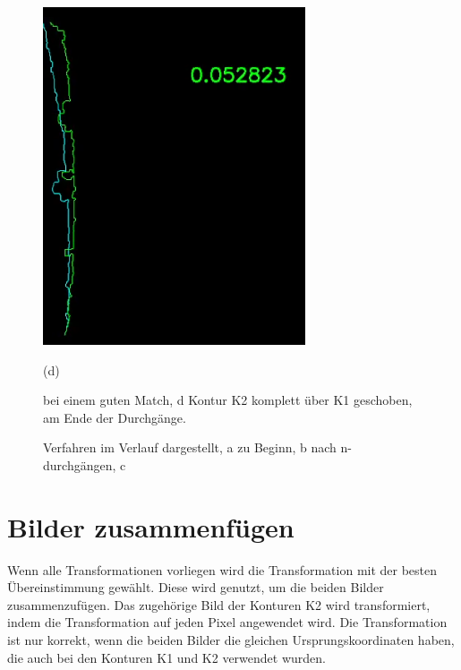 \begin{figure}[h]
\begin{minipage}{0.24\textwidth}
        \includegraphics[width=\textwidth]{images/stitching_end.PNG} %
        \caption*{(d)}
    \end{minipage}\hfill
    \caption{Verfahren im Verlauf dargestellt, a zu Beginn, b nach n-durchgängen, c }
    bei einem guten Match, d Kontur K2 komplett über K1 geschoben, 
    am Ende der Durchgänge.
    \label{fig:stitching_all}
\end{figure}

\section{Bilder zusammenfügen}

Wenn alle Transformationen vorliegen wird die Transformation mit der besten 
Übereinstimmung gewählt. Diese wird genutzt, um die beiden Bilder zusammenzufügen.
Das zugehörige Bild der Konturen K2 wird transformiert, indem die Transformation 
auf jeden Pixel angewendet wird.  
Die Transformation ist nur korrekt, wenn die beiden Bilder die gleichen 
Ursprungskoordinaten haben, die auch bei den Konturen K1 und K2 verwendet wurden.

